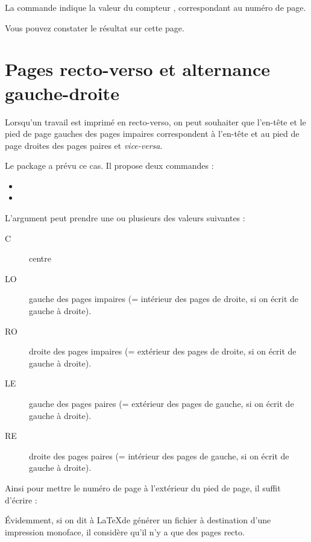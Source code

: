 La commande  indique la valeur du compteur , correspondant au numéro de page.

Vous pouvez constater le résultat sur cette page.\thispagestyle{fancy}\cfoot{{\thepage} / \ref{TotPages}} \renewcommand{\headrulewidth}{0pt}

\section{Pages recto-verso et alternance gauche-droite}

Lorsqu'un travail est imprimé en recto-verso, on peut souhaiter que l'en-tête et le pied de page gauches des pages impaires correspondent à l'en-tête et au pied de page droites des pages paires et \emph{vice-versa}.

Le package  a prévu ce cas. Il propose deux commandes : 
\begin{itemize}
\item {}
\item {}
\end{itemize}

L'argument  peut prendre une ou plusieurs des valeurs suivantes :
\begin{description}
\item[C] centre
\item[LO] gauche des pages impaires (= intérieur des pages de droite, si on écrit de gauche à droite).
\item[RO] droite des pages impaires (= extérieur des pages de droite, si on écrit de gauche à droite).
\item[LE] gauche des pages paires (= extérieur des pages  de gauche, si on écrit de gauche à droite).
\item[RE] droite des pages paires (= intérieur des pages de gauche, si on écrit de gauche à droite).
\end{description}

Ainsi pour mettre le numéro de page à l'extérieur du pied de page, il suffit d'écrire :

\begin{latexcode}
\fancyfoot[LE,RO]{\thepage}
\end{latexcode}

Évidemment, si on dit à \LaTeX de générer un fichier à destination d'une impression monoface, il considère qu'il n'y a que des pages recto.

